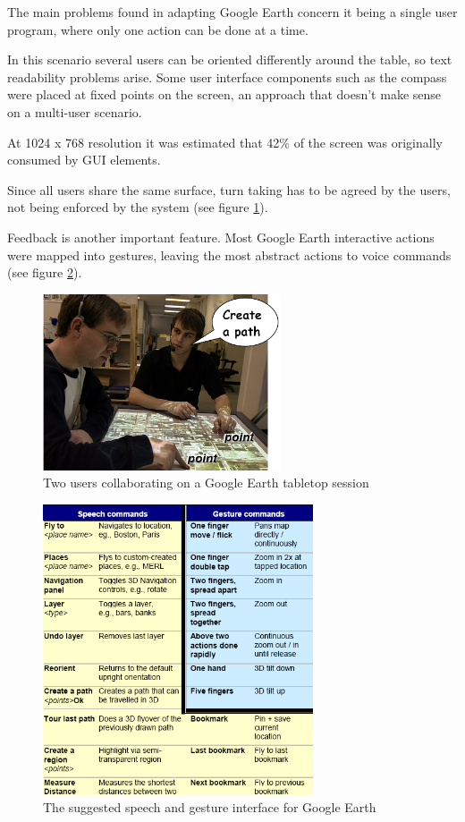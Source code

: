 The main problems found in adapting Google Earth concern it being a single user program,
where only one action can be done at a time.

In this scenario several users can be oriented differently around the table,
so text readability problems arise.
Some user interface components such as the compass were placed at fixed points on the screen,
an approach that doesn't make sense on a multi-user scenario.

At 1024 x 768 resolution it was estimated that 42\% of the screen was originally
consumed by GUI elements.

Since all users share the same surface, turn taking has to be agreed by the users,
not being enforced by the system (see figure \ref{FIG-SP-TABLETOP}).

Feedback is another important feature.
Most Google Earth interactive actions were mapped into gestures,
leaving the most abstract actions to voice commands (see figure \ref{FIG-SP-TABLETOP2}).


\begin{figure}[!ht]
    \centering
    \includegraphics[width=7cm]{gfx/sp-gest-ttop.png}
    \caption{Two users collaborating on a Google Earth tabletop session}
    \label{FIG-SP-TABLETOP}
\end{figure}

\begin{figure}[!ht]
    \centering
    \includegraphics[width=8cm]{gfx/sp-gest-ttop2.png}
    \caption{The suggested speech and gesture interface for Google Earth}
    \label{FIG-SP-TABLETOP2}
\end{figure}

